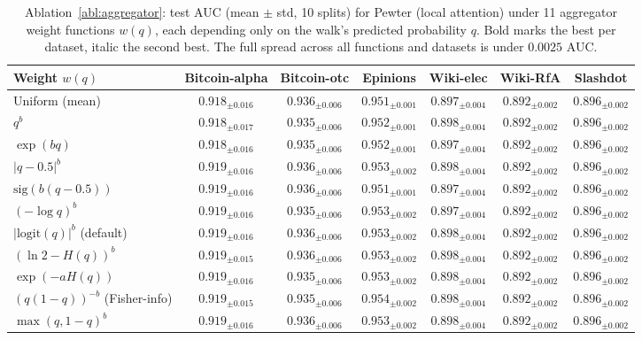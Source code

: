 \documentclass[sigconf]{acmart}
\newcounter{ablation}
\theoremstyle{plain}
\theoremstyle{definition}
\begin{document}
\begin{table}[t!]
\centering
\small
\caption{Ablation~\ref{abl:aggregator}: test AUC (mean $\pm$ std, 10 splits) for Pewter (local attention) under 11 aggregator weight functions $w(q)$, each depending only on the walk's predicted probability $q$. Bold marks the best per dataset, italic the second best. The full spread across all functions and datasets is under $0.0025$ AUC.}
\label{tab:ablationB}
\begin{tabular}{lcccccc}
\toprule
Weight $w(q)$ & Bitcoin-alpha & Bitcoin-otc & Epinions & Wiki-elec & Wiki-RfA & Slashdot \\
\midrule
Uniform (mean) & $0.918_{\pm0.016}$ & $\mathit{0.936_{\pm0.006}}$ & $0.951_{\pm0.001}$ & $0.897_{\pm0.004}$ & $0.892_{\pm0.002}$ & $0.896_{\pm0.002}$ \\
$q^b$ & $0.918_{\pm0.017}$ & $0.935_{\pm0.006}$ & $0.952_{\pm0.001}$ & $0.898_{\pm0.004}$ & $0.892_{\pm0.002}$ & $0.896_{\pm0.002}$ \\
$\exp(bq)$ & $0.918_{\pm0.016}$ & $0.935_{\pm0.006}$ & $0.952_{\pm0.001}$ & $0.897_{\pm0.004}$ & $0.892_{\pm0.002}$ & $0.896_{\pm0.002}$ \\
$|q-0.5|^b$ & $0.919_{\pm0.016}$ & $0.936_{\pm0.006}$ & $0.953_{\pm0.002}$ & $0.898_{\pm0.004}$ & $0.892_{\pm0.002}$ & $0.896_{\pm0.002}$ \\
$\mathrm{sig}(b(q-0.5))$ & $0.919_{\pm0.016}$ & $\mathbf{0.936_{\pm0.006}}$ & $0.951_{\pm0.001}$ & $0.897_{\pm0.004}$ & $0.892_{\pm0.002}$ & $0.896_{\pm0.002}$ \\
$(-\log q)^b$ & $\mathbf{0.919_{\pm0.016}}$ & $0.935_{\pm0.006}$ & $0.953_{\pm0.002}$ & $0.897_{\pm0.004}$ & $0.892_{\pm0.002}$ & $0.896_{\pm0.002}$ \\
$|\mathrm{logit}(q)|^b$ (default) & $0.919_{\pm0.016}$ & $0.936_{\pm0.006}$ & $\mathit{0.953_{\pm0.002}}$ & $0.898_{\pm0.004}$ & $0.892_{\pm0.002}$ & $0.896_{\pm0.002}$ \\
$(\ln2-H(q))^b$ & $0.919_{\pm0.015}$ & $0.936_{\pm0.006}$ & $0.953_{\pm0.002}$ & $0.898_{\pm0.004}$ & $0.892_{\pm0.002}$ & $0.896_{\pm0.002}$ \\
$\exp(-aH(q))$ & $0.919_{\pm0.016}$ & $0.935_{\pm0.006}$ & $0.953_{\pm0.002}$ & $\mathit{0.898_{\pm0.004}}$ & $\mathit{0.892_{\pm0.002}}$ & $\mathit{0.896_{\pm0.002}}$ \\
$(q(1-q))^{-b}$ (Fisher-info) & $\mathit{0.919_{\pm0.015}}$ & $0.935_{\pm0.006}$ & $\mathbf{0.954_{\pm0.002}}$ & $\mathbf{0.898_{\pm0.004}}$ & $\mathbf{0.892_{\pm0.002}}$ & $\mathbf{0.896_{\pm0.002}}$ \\
$\max(q,1-q)^b$ & $0.919_{\pm0.016}$ & $0.936_{\pm0.006}$ & $0.953_{\pm0.002}$ & $0.898_{\pm0.004}$ & $0.892_{\pm0.002}$ & $0.896_{\pm0.002}$ \\
\bottomrule
\end{tabular}
\end{table}
\end{document}
